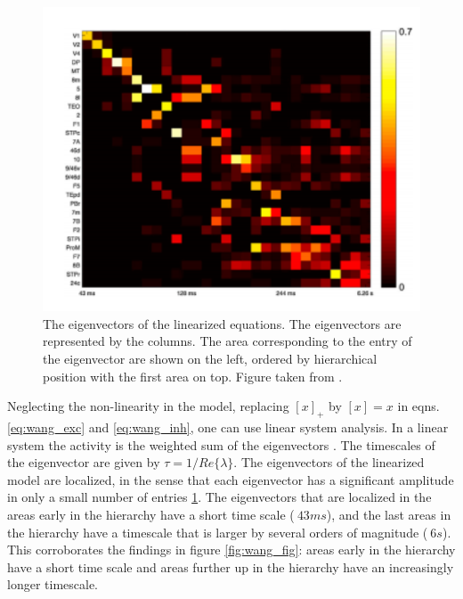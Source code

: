 \begin{figure}[!ht]
\centering
\includegraphics[scale=0.4]{wang_figures/eigenvecs}
\caption{ The eigenvectors of the linearized equations. The eigenvectors are represented by the columns. The area corresponding to the entry of the eigenvector are shown on the left, ordered by hierarchical position with the first area on top.
Figure taken from \cite{chaudhuri2015large-scale}.
}
\label{fig:wang_eigenvecs}
\end{figure}

Neglecting the non-linearity in the model, replacing $[x]_+$ by  $[x]=x$ in eqns. \ref{eq:wang_exc} and \ref{eq:wang_inh}, one can use linear system analysis. In a linear system the activity is the weighted sum of the eigenvectors \cite{rugh1993linear}. The timescales of the eigenvector are given by $\tau = 1/Re\{\lambda\}$. The eigenvectors of the linearized model are localized, in the sense that each eigenvector has a significant amplitude in only a small number of entries \ref{fig:wang_eigenvecs}. The eigenvectors that are localized in the areas early in the hierarchy have a short time scale ($~43 ms$), and the last areas in the hierarchy have a timescale that is larger by several orders of magnitude ($~6 s$). This corroborates the findings in figure \ref{fig:wang_fig}: areas early in the hierarchy have a short time scale and areas further up in the hierarchy have an increasingly longer timescale.

